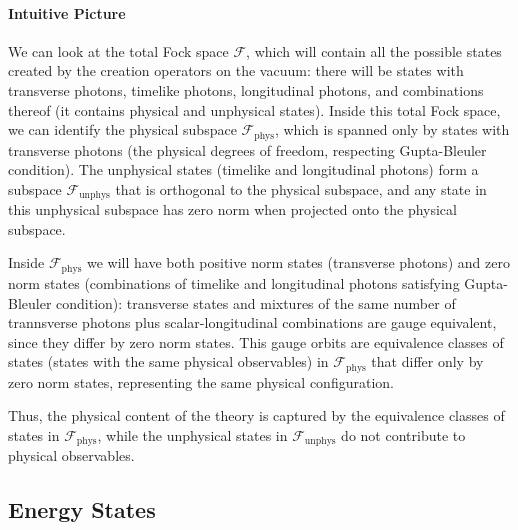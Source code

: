 \paragraph{Intuitive Picture}
We can look at the total Fock space \(\mathcal{F}\), which will contain all the possible states created by the creation operators on the vacuum: there will be states with transverse photons, timelike photons, longitudinal photons, and combinations thereof (it contains physical and unphysical states). Inside this total Fock space, we can identify the physical subspace \(\mathcal{F}_{\text{phys}}\), which is spanned only by states with transverse photons (the physical degrees of freedom, respecting Gupta-Bleuler condition). The unphysical states (timelike and longitudinal photons) form a subspace \(\mathcal{F}_{\text{unphys}}\) that is orthogonal to the physical subspace, and any state in this unphysical subspace has zero norm when projected onto the physical subspace.

Inside \(\mathcal{F}_{\text{phys}}\) we will have both positive norm states (transverse photons) and zero norm states (combinations of timelike and longitudinal photons satisfying Gupta-Bleuler condition): transverse states and mixtures of the same number of trannsverse photons plus scalar-longitudinal combinations are gauge equivalent, since they differ by zero norm states. This gauge orbits are equivalence classes of states (states with the same physical observables) in \(\mathcal{F}_{\text{phys}}\) that differ only by zero norm states, representing the same physical configuration.

Thus, the physical content of the theory is captured by the equivalence classes of states in \(\mathcal{F}_{\text{phys}}\), while the unphysical states in \(\mathcal{F}_{\text{unphys}}\) do not contribute to physical observables.

\subsection{Energy States}

